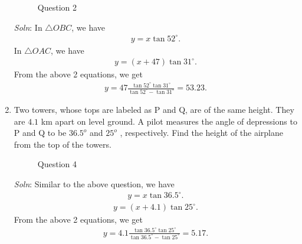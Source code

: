 \documentclass{article}
\begin{document}
\begin{enumerate}
\begin{figure}[ht]
\begin{tikzpicture}[scale=0.5]
    \end{tikzpicture}
    \caption{Question 2}
  \end{figure}

  \emph{Soln}: In $\triangle OBC$, we have
  \begin{align*}
    y = x \tan 52^\circ.
  \end{align*}
  In $\triangle OAC$, we have
  \begin{align*}
    y = (x+47)\tan 31^\circ.
  \end{align*}
  From the above 2 equations, we get
  \begin{align*}
    y = 47\frac{\tan 52^\circ\tan 31^\circ}{\tan 52^\circ-\tan 31^\circ} = 53.23.
  \end{align*}

\item Two towers, whose tops are labeled as P and Q, are of the same height. They are $4.1$ km apart on level ground. A pilot measures the angle of depressions to P and Q to be $36.5^o$ and $25^o$ , respectively. Find the height of the airplane from the top of the towers.

   \begin{figure}[ht]
    \centering
    \caption{Question 4}
  \end{figure}
   \emph{Soln}: Similar to the above question, we have
  \begin{align*}
    y = x \tan 36.5^\circ.
  \end{align*}
  \begin{align*}
    y = (x+4.1)\tan 25^\circ.
  \end{align*}
  From the above 2 equations, we get
  \begin{align*}
    y = 4.1\frac{\tan 36.5^\circ\tan 25^\circ}{\tan 36.5^\circ-\tan 25^\circ} = 5.17.
  \end{align*}


\end{enumerate}
\end{document}
